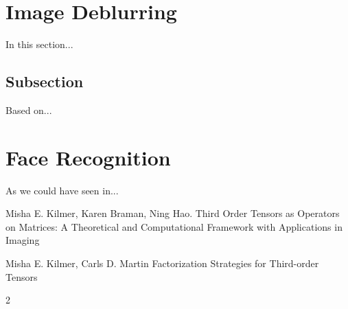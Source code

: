 \documentclass[twoside]{article}
\begin{document}
\begin{multicols}{2}
\section{Image Deblurring}
In this section...

\subsection{Subsection}
Based on...


\section{Face Recognition}
As we could have seen in...





\begin{thebibliography}{99}

Misha E. Kilmer, Karen Braman, Ning Hao.
\newblock Third Order Tensors as Operators on Matrices: A
Theoretical and Computational Framework with
Applications in Imaging

Misha E. Kilmer, Carls D. Martin
\newblock Factorization Strategies for Third-order Tensors
 
\end{thebibliography}


\end{multicols}{2}
\end{document}
